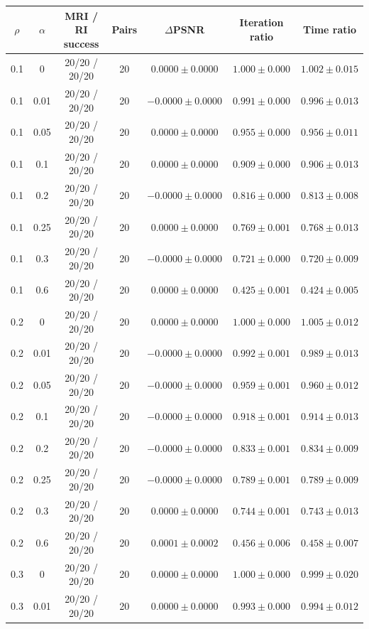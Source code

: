 \begin{tabular}{ccccccc}\hline
$\rho$ & $\alpha$ & MRI / RI success & Pairs & $\Delta$PSNR & Iteration ratio & Time ratio \\
\hline
0.1 & 0 & 20/20 / 20/20 & 20 & $0.0000 \pm 0.0000$ & $1.000 \pm 0.000$ & $1.002 \pm 0.015$ \\
0.1 & 0.01 & 20/20 / 20/20 & 20 & $-0.0000 \pm 0.0000$ & $0.991 \pm 0.000$ & $0.996 \pm 0.013$ \\
0.1 & 0.05 & 20/20 / 20/20 & 20 & $0.0000 \pm 0.0000$ & $0.955 \pm 0.000$ & $0.956 \pm 0.011$ \\
0.1 & 0.1 & 20/20 / 20/20 & 20 & $0.0000 \pm 0.0000$ & $0.909 \pm 0.000$ & $0.906 \pm 0.013$ \\
0.1 & 0.2 & 20/20 / 20/20 & 20 & $-0.0000 \pm 0.0000$ & $0.816 \pm 0.000$ & $0.813 \pm 0.008$ \\
0.1 & 0.25 & 20/20 / 20/20 & 20 & $0.0000 \pm 0.0000$ & $0.769 \pm 0.001$ & $0.768 \pm 0.013$ \\
0.1 & 0.3 & 20/20 / 20/20 & 20 & $-0.0000 \pm 0.0000$ & $0.721 \pm 0.000$ & $0.720 \pm 0.009$ \\
0.1 & 0.6 & 20/20 / 20/20 & 20 & $0.0000 \pm 0.0000$ & $0.425 \pm 0.001$ & $0.424 \pm 0.005$ \\
0.2 & 0 & 20/20 / 20/20 & 20 & $0.0000 \pm 0.0000$ & $1.000 \pm 0.000$ & $1.005 \pm 0.012$ \\
0.2 & 0.01 & 20/20 / 20/20 & 20 & $-0.0000 \pm 0.0000$ & $0.992 \pm 0.001$ & $0.989 \pm 0.013$ \\
0.2 & 0.05 & 20/20 / 20/20 & 20 & $-0.0000 \pm 0.0000$ & $0.959 \pm 0.001$ & $0.960 \pm 0.012$ \\
0.2 & 0.1 & 20/20 / 20/20 & 20 & $-0.0000 \pm 0.0000$ & $0.918 \pm 0.001$ & $0.914 \pm 0.013$ \\
0.2 & 0.2 & 20/20 / 20/20 & 20 & $-0.0000 \pm 0.0000$ & $0.833 \pm 0.001$ & $0.834 \pm 0.009$ \\
0.2 & 0.25 & 20/20 / 20/20 & 20 & $-0.0000 \pm 0.0000$ & $0.789 \pm 0.001$ & $0.789 \pm 0.009$ \\
0.2 & 0.3 & 20/20 / 20/20 & 20 & $0.0000 \pm 0.0000$ & $0.744 \pm 0.001$ & $0.743 \pm 0.013$ \\
0.2 & 0.6 & 20/20 / 20/20 & 20 & $0.0001 \pm 0.0002$ & $0.456 \pm 0.006$ & $0.458 \pm 0.007$ \\
0.3 & 0 & 20/20 / 20/20 & 20 & $0.0000 \pm 0.0000$ & $1.000 \pm 0.000$ & $0.999 \pm 0.020$ \\
0.3 & 0.01 & 20/20 / 20/20 & 20 & $0.0000 \pm 0.0000$ & $0.993 \pm 0.000$ & $0.994 \pm 0.012$ \\

\end{tabular}

